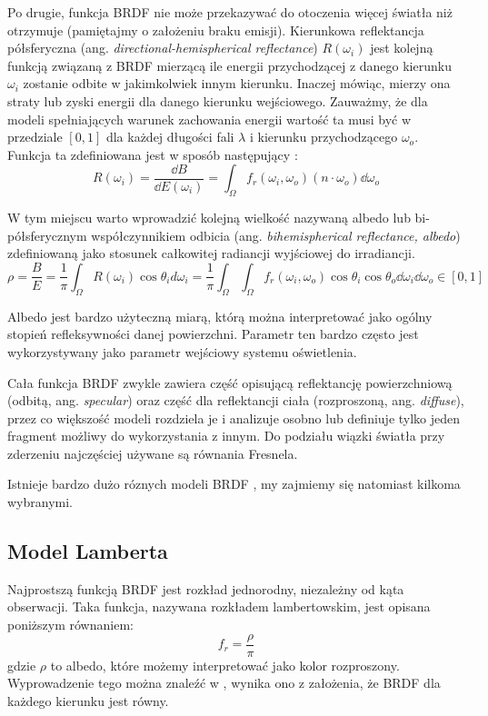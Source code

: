 \documentclass[../main.tex]{subfiles}
\begin{document}
Po drugie, funkcja BRDF nie może przekazywać do otoczenia więcej światła niż otrzymuje (pamiętajmy o założeniu braku emisji). Kierunkowa reflektancja półsferyczna (ang. \textit{directional-hemispherical reflectance}) $R(\omega_i)$ jest kolejną funkcją związaną z BRDF mierzącą ile energii przychodzącej z danego kierunku $\omega_i$ zostanie odbite w jakimkolwiek innym kierunku. Inaczej mówiąc, mierzy ona straty lub zyski energii dla danego kierunku wejściowego. Zauważmy, że dla modeli spełniających warunek zachowania energii wartość ta musi być w przedziale $\left[0,1\right]$ dla każdej długości fali $\lambda$ i kierunku przychodzącego $\omega_o$. Funkcja ta zdefiniowana jest w sposób następujący \cite{RealTimeRendering2008}:
\[
  R(\omega_i) 
  = \frac{\dd B}{\dd E(\omega_i)} 
  = \int_{\Omega} {
    f_r(\omega_i, \omega_o)
    (n \cdot \omega_o)
    \dd \omega_o
  }
\]

W tym miejscu warto wprowadzić kolejną wielkość nazywaną albedo lub bi-półsferycznym współczynnikiem odbicia (ang. \textit{bihemispherical reflectance, albedo}) zdefiniowaną jako stosunek całkowitej radiancji wyjściowej do irradiancji.
\[
    \rho = \frac{B}{E} = \frac{1}{\pi} \int_{\Omega}{
        R(\omega_i) \cos\theta_i d\omega_i
    }
    = \frac{1}{\pi} \int_{\Omega} \int_{\Omega} {
        f_r(\omega_i, \omega_o) 
        \cos\theta_i 
        \cos\theta_o 
        \dd\omega_i 
        \dd\omega_o
    }
    \in \left[0, 1\right]
\]

Albedo jest bardzo użyteczną miarą, którą można interpretować jako ogólny stopień refleksywności danej powierzchni. Parametr ten bardzo często jest wykorzystywany jako parametr wejściowy systemu oświetlenia.

Cała funkcja BRDF zwykle zawiera część opisującą reflektancję powierzchniową (odbitą, ang. \textit{specular}) oraz część dla reflektancji ciała (rozproszoną, ang. \textit{diffuse}), przez co większość modeli rozdziela je i analizuje osobno lub definiuje tylko jeden fragment możliwy do wykorzystania z innym. Do podziału wiązki światła przy zderzeniu najczęściej używane są równania Fresnela.

Istnieje bardzo dużo róznych modeli BRDF \cite{brdf_overview}, my zajmiemy się natomiast kilkoma wybranymi.

\subsection{Model Lamberta}

Najprostszą funkcją BRDF jest rozkład jednorodny, niezależny od kąta obserwacji. Taka funkcja, nazywana rozkładem lambertowskim, jest opisana poniższym równaniem:
\[
  f_r = \frac{\rho}{\pi}
\]
\noindent gdzie $\rho$ to albedo, które możemy interpretować jako kolor rozproszony. Wyprowadzenie tego można znaleźć w \cite{RealTimeRendering2008}\cite{pbr_games_siggraph}, wynika ono z założenia, że BRDF dla każdego kierunku jest równy.
\end{document}

